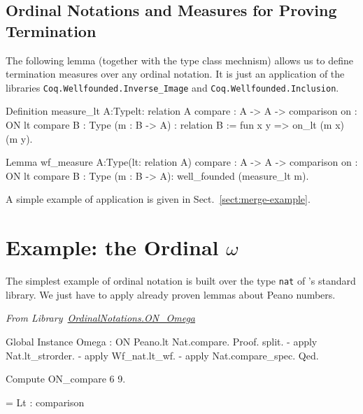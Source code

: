 \subsection{Ordinal Notations and Measures for Proving Termination}
\label{sect:measure-ON}

The following lemma (together with the type class mechnism) allows us to define termination measures over any ordinal notation. It is just an application of  the libraries \texttt{Coq.Wellfounded.Inverse\_Image}
and  \texttt{Coq.Wellfounded.Inclusion}. 

\begin{Coqsrc}
Definition measure_lt {A:Type}{lt: relation A}
            {compare : A -> A -> comparison}
            {on : ON lt compare}
            {B : Type} (m : B -> A) : relation B :=
             fun x y => on_lt (m x) (m y).
            
Lemma wf_measure  {A:Type}(lt: relation A)
            {compare : A -> A -> comparison}
            {on : ON lt compare}
            {B : Type}
            (m : B -> A):  well_founded (measure_lt m). 
\end{Coqsrc}

A simple example of application is given in Sect.~\vref{sect:merge-example}.


\section{Example: the Ordinal \texorpdfstring{$\omega$}{omega}}




The simplest example of ordinal notation is built over the type \texttt{nat} of \coq's standard library. We just have to apply already proven lemmas about Peano numbers.

\vspace{4pt}
\noindent\emph{From Library~\href{../theories/html/hydras.OrdinalNotations/ON_Omega.html}{OrdinalNotations.ON\_Omega}}


\begin{Coqsrc}
Global Instance Omega : ON  Peano.lt Nat.compare.
Proof.
 split.
 - apply Nat.lt_strorder.
 - apply Wf_nat.lt_wf.
 - apply Nat.compare_spec.
Qed.

Compute ON_compare 6 9.
\end{Coqsrc}

\begin{Coqanswer}
     = Lt
     : comparison
\end{Coqanswer}


